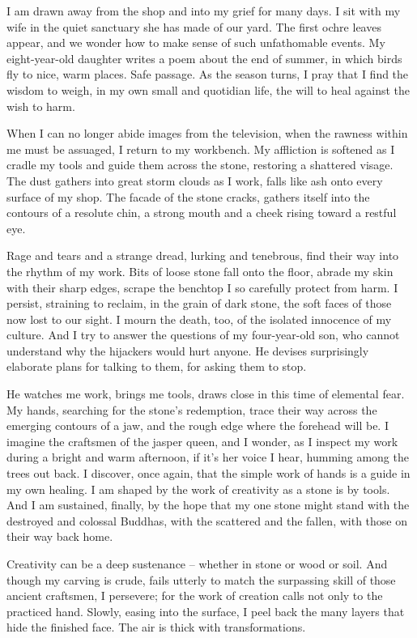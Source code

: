 \documentclass[10pt,DIV09,letterpaper,oneside,headsepline]{scrreprt}
\begin{document}
I am drawn away from the shop and into my grief for many days. I sit with my wife in the quiet sanctuary she has made of our yard. The first ochre leaves appear, and we wonder how to make sense of such unfathomable events. My eight-year-old daughter writes a poem about the end of summer, in which birds fly to nice, warm places. Safe passage. As the season turns, I pray that I find the wisdom to weigh, in my own small and quotidian life, the will to heal against the wish to harm.

When I can no longer abide images from the television, when the rawness within me must be assuaged, I return to my workbench. My affliction is softened as I cradle my tools and guide them across the stone, restoring a shattered visage. The dust gathers into great storm clouds as I work, falls like ash onto every surface of my shop. The facade of the stone cracks, gathers itself into the contours of a resolute chin, a strong mouth and a cheek rising toward a restful eye.

Rage and tears and a strange dread, lurking and tenebrous, find their way into the rhythm of my work. Bits of loose stone fall onto the floor, abrade my skin with their sharp edges, scrape the benchtop I so carefully protect from harm. I persist, straining to reclaim, in the grain of dark stone, the soft faces of those now lost to our sight. I mourn the death, too, of the isolated innocence of my culture. And I try to answer the questions of my four-year-old son, who cannot understand why the hijackers would hurt anyone. He devises surprisingly elaborate plans for talking to them, for asking them to stop.

He watches me work, brings me tools, draws close in this time of elemental fear. My hands, searching for the stone's redemption, trace their way across the emerging contours of a jaw, and the rough edge where the forehead will be. I imagine the craftsmen of the jasper queen, and I wonder, as I inspect my work during a bright and warm afternoon, if it's her voice I hear, humming among the trees out back. I discover, once again, that the simple work of hands is a guide in my own healing. I am shaped by the work of creativity as a stone is by tools. And I am sustained, finally, by the hope that my one stone might stand with the destroyed and colossal Buddhas, with the scattered and the fallen, with those on their way back home.

Creativity can be a deep sustenance -- whether in stone or wood or soil. And though my carving is crude, fails utterly to match the surpassing skill of those ancient craftsmen, I persevere; for the work of creation calls not only to the practiced hand. Slowly, easing into the surface, I peel back the many layers that hide the finished face. The air is thick with transformations.
\end{document}
